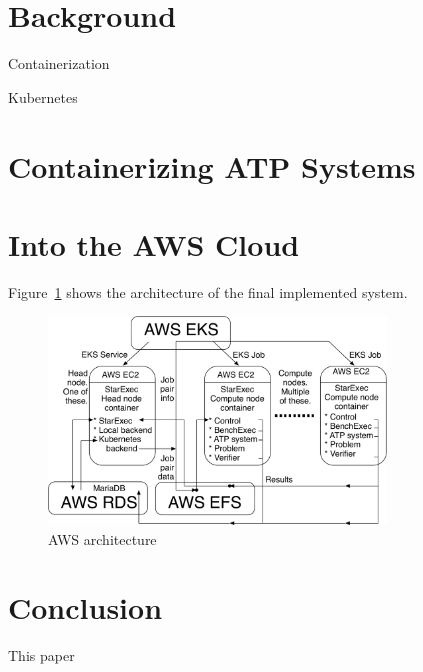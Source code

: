 \documentclass{easychair}
\begin{document}
\section{Background}
\label{Background}

Containerization

Kubernetes

\section{Containerizing ATP Systems}
\label{ATPSystems}

\section{Into the AWS Cloud}
\label{AWSCloud}

Figure~\ref{AWSArchitecture} shows the architecture of the final implemented system.

\begin{figure}[htb]
\begin{center}
\includegraphics[width=0.8\textwidth]{AWSArchitecture}
\caption{AWS architecture}
\label{AWSArchitecture}
\end{center}
\end{figure}

\section{Conclusion}
\label{Conclusion}

This paper 


\end{document}
